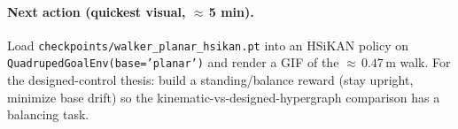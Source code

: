 \documentclass[11pt]{article}
\begin{document}
\paragraph{Next action (quickest visual, $\approx$\,5 min).} Load
\texttt{checkpoints/walker\_planar\_hsikan.pt} into an HSiKAN policy on
\texttt{QuadrupedGoalEnv(base='planar')} and render a GIF of the $\approx$\,$0.47$\,m
walk. For the designed-control thesis: build a standing/balance reward (stay
upright, minimize base drift) so the kinematic-vs-designed-hypergraph comparison
has a balancing task.
\end{document}
